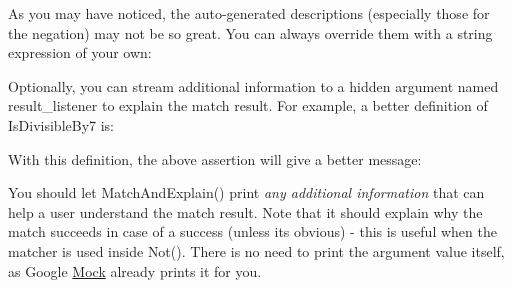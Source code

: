 As you may have noticed, the auto-\/generated descriptions (especially those for the negation) may not be so great. You can always override them with a string expression of your own\+: 
\begin{DoxyCode}{0}
\DoxyCodeLine{                        \textcolor{stringliteral}{" divisible by 7"}) \{}
\DoxyCodeLine{\}}
\end{DoxyCode}


Optionally, you can stream additional information to a hidden argument named {\ttfamily result\+\_\+listener} to explain the match result. For example, a better definition of {\ttfamily Is\+Divisible\+By7} is\+: 
\begin{DoxyCode}{0}
\DoxyCodeLine{    \textcolor{keywordflow}{return} \textcolor{keyword}{true};}
\DoxyCodeLine{}
\DoxyCodeLine{  \textcolor{keywordflow}{return} \textcolor{keyword}{false};}
\DoxyCodeLine{\}}
\end{DoxyCode}


With this definition, the above assertion will give a better message\+: 
\begin{DoxyCode}{0}
\end{DoxyCode}


You should let {\ttfamily Match\+And\+Explain()} print {\itshape any additional information} that can help a user understand the match result. Note that it should explain why the match succeeds in case of a success (unless it\textquotesingle{}s obvious) -\/ this is useful when the matcher is used inside {\ttfamily Not()}. There is no need to print the argument value itself, as Google \mbox{\hyperlink{class_mock}{Mock}} already prints it for you.

